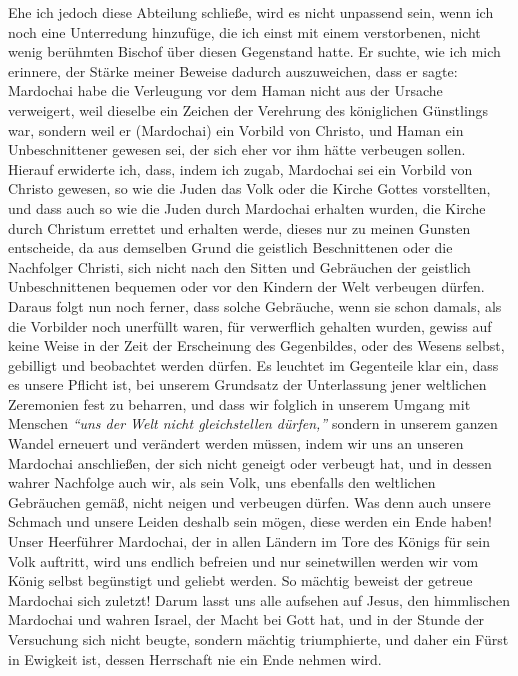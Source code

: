 Ehe ich jedoch diese Abteilung schließe, wird es nicht unpassend sein, wenn ich
noch eine Unterredung hinzufüge, die ich einst mit einem verstorbenen, nicht
wenig berühmten Bischof über diesen
Gegenstand
hatte. Er suchte, wie ich mich
erinnere, der Stärke meiner Beweise dadurch auszuweichen, dass er sagte:
Mardochai habe die Verleugung vor dem Haman nicht
aus der Ursache verweigert,
weil dieselbe ein Zeichen der Verehrung des königlichen Günstlings war, sondern
weil er (Mardochai) ein Vorbild von Christo, und Haman ein Unbeschnittener
gewesen sei, der sich eher vor ihm hätte verbeugen sollen. Hierauf erwiderte
ich, dass, indem ich zugab, Mardochai sei ein Vorbild von Christo gewesen, so
wie die Juden das Volk oder die Kirche Gottes vorstellten, und dass auch so wie
die Juden durch Mardochai erhalten wurden, die
Kirche durch Christum errettet
und erhalten werde, dieses nur zu meinen Gunsten entscheide, da aus demselben
Grund die geistlich Beschnittenen oder die
Nachfolger Christi, sich nicht nach
den Sitten und Gebräuchen der geistlich Unbeschnittenen bequemen oder vor den
Kindern der Welt verbeugen dürfen. Daraus folgt nun noch ferner, dass solche
Gebräuche, wenn sie schon damals, als die Vorbilder noch unerfüllt waren, für
verwerflich gehalten wurden, gewiss auf keine Weise in der Zeit der Erscheinung
des Gegenbildes, oder des Wesens selbst, gebilligt und beobachtet werden dürfen.
Es leuchtet im Gegenteile klar ein, dass es unsere Pflicht ist, bei unserem
Grundsatz der Unterlassung jener weltlichen Zeremonien fest zu beharren, und
dass wir folglich in unserem Umgang mit Menschen
\textit{"`uns der Welt nicht gleichstellen dürfen,"'}
sondern in unserem ganzen Wandel erneuert und verändert
werden müssen, indem wir uns an unseren Mardochai anschließen, der sich nicht
geneigt oder verbeugt hat, und in dessen wahrer Nachfolge auch wir, als sein
Volk, uns ebenfalls den weltlichen Gebräuchen gemäß, nicht neigen und verbeugen
dürfen. Was denn auch unsere Schmach und unsere Leiden deshalb sein mögen, diese
werden ein Ende haben! Unser Heerführer Mardochai, der in allen Ländern im Tore
des Königs für sein Volk auftritt, wird uns endlich befreien und nur
seinetwillen werden wir vom König selbst begünstigt und geliebt werden. So
mächtig beweist der getreue Mardochai sich zuletzt! Darum lasst uns alle
aufsehen auf Jesus, den himmlischen Mardochai und wahren
Israel, der Macht bei
Gott hat, und in der Stunde der Versuchung sich nicht beugte,
sondern mächtig
triumphierte, und daher ein Fürst in Ewigkeit ist, dessen Herrschaft nie ein
Ende
nehmen wird.

